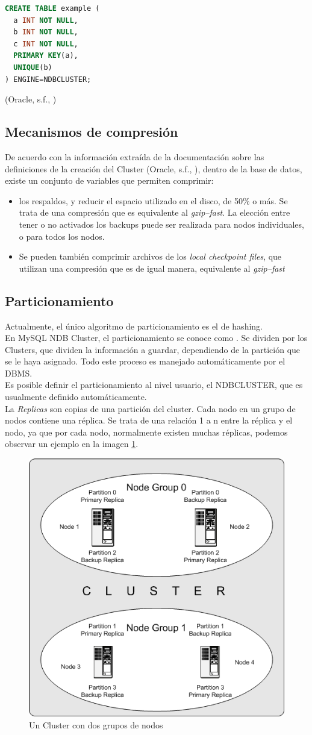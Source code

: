 \documentclass{acmart}
\begin{document}
\begin{lstlisting}[language=sql]
    CREATE TABLE example (
  a INT NOT NULL,
  b INT NOT NULL,
  c INT NOT NULL,
  PRIMARY KEY(a),
  UNIQUE(b)
) ENGINE=NDBCLUSTER;
\end{lstlisting}
(Oracle, s.f., \cite{mysqlcomp})

\subsection{Mecanismos de compresión}
De acuerdo con la información extraída de la documentación sobre las definiciones de la creación del Cluster (Oracle, s.f., \cite{mysqlcomp}), dentro de la base de datos, existe un conjunto de variables que permiten comprimir:
\begin{itemize}
    \item los respaldos, y reducir el espacio utilizado en el disco, de 50\% o más. Se trata de una compresión que es equivalente al \textit{gzip--fast}. La elección entre tener o no activados los backups puede ser realizada para nodos individuales, o para todos los nodos.
    \item Se pueden también comprimir archivos de los \textit{local checkpoint files}, que utilizan una compresión que es de igual manera, equivalente al \textit{gzip--fast}
\end{itemize}


\subsection{Particionamiento}
Actualmente, el único algoritmo de particionamiento es el de hashing.\\
En MySQL NDB Cluster, el particionamiento se conoce como . Se dividen por los Clusters, que dividen la información a guardar, dependiendo de la partición que se le haya asignado. Todo este proceso es manejado automáticamente por el DBMS.\\
Es posible definir el particionamiento al nivel usuario, el NDBCLUSTER, que es usualmente definido automáticamente.\\
La \textit{Replicas} son copias de una partición del cluster. Cada nodo en un grupo de nodos contiene una réplica. Se trata de una relación 1 a n entre la réplica y el nodo, ya que por cada nodo, normalmente existen muchas réplicas, podemos observar un ejemplo en la imagen \ref{dosnodos}.

\begin{figure}
    \centering
    \includegraphics[width=0.4\linewidth]{replicas.png}
    \caption{Un Cluster con dos grupos de nodos}
    \label{dosnodos}
\end{figure}
\end{document}
